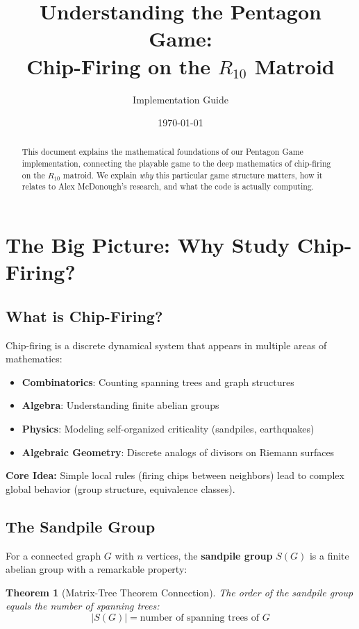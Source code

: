 \documentclass[11pt]{article}
\title{Understanding the Pentagon Game:\\Chip-Firing on the $R_{10}$ Matroid}
\author{Implementation Guide}
\date{\today}
\newtheorem{theorem}{Theorem}
\begin{document}
\maketitle

\begin{abstract}
This document explains the mathematical foundations of our Pentagon Game implementation, connecting the playable game to the deep mathematics of chip-firing on the $R_{10}$ matroid. We explain \emph{why} this particular game structure matters, how it relates to Alex McDonough's research, and what the code is actually computing.
\end{abstract}

\section{The Big Picture: Why Study Chip-Firing?}

\subsection{What is Chip-Firing?}

Chip-firing is a discrete dynamical system that appears in multiple areas of mathematics:

\begin{itemize}
    \item \textbf{Combinatorics}: Counting spanning trees and graph structures
    \item \textbf{Algebra}: Understanding finite abelian groups
    \item \textbf{Physics}: Modeling self-organized criticality (sandpiles, earthquakes)
    \item \textbf{Algebraic Geometry}: Discrete analogs of divisors on Riemann surfaces
\end{itemize}

\textbf{Core Idea:} Simple local rules (firing chips between neighbors) lead to complex global behavior (group structure, equivalence classes).

\subsection{The Sandpile Group}

For a connected graph $G$ with $n$ vertices, the \textbf{sandpile group} $S(G)$ is a finite abelian group with a remarkable property:

\begin{theorem}[Matrix-Tree Theorem Connection]
The order of the sandpile group equals the number of spanning trees:
\[
|S(G)| = \text{number of spanning trees of } G
\]
\end{theorem}
\end{document}
